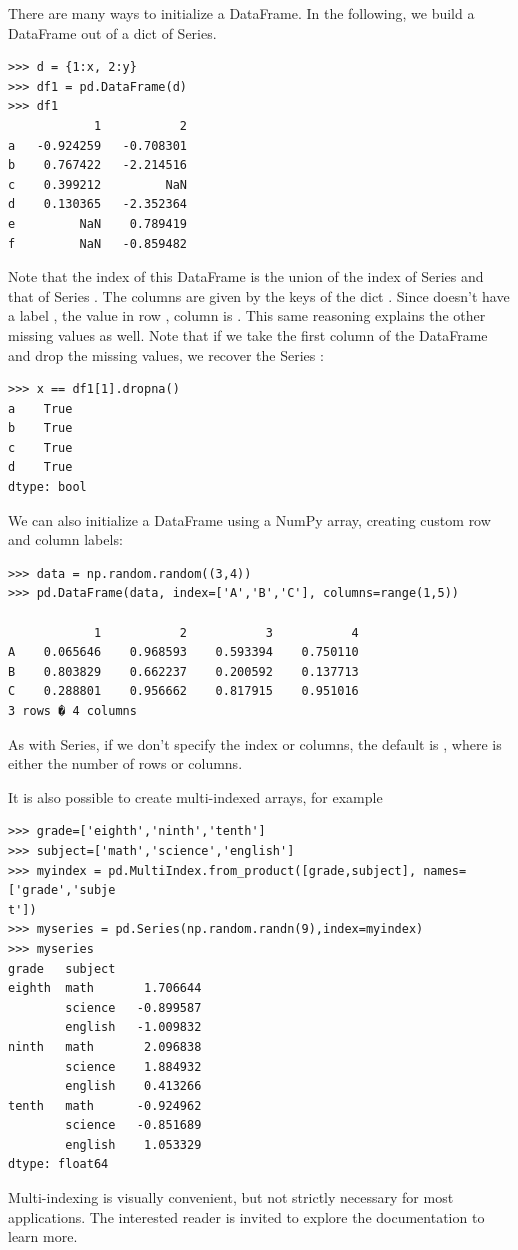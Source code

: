 There are many ways to initialize a DataFrame. In the following, we build a DataFrame out of a
dict of Series.
\begin{lstlisting}
>>> d = {1:x, 2:y}
>>> df1 = pd.DataFrame(d)
>>> df1
	        1	        2
a	-0.924259	-0.708301
b	 0.767422	-2.214516
c	 0.399212	      NaN
d	 0.130365	-2.352364
e	      NaN	 0.789419
f	      NaN	-0.859482
\end{lstlisting}
Note that the index of this DataFrame is the union of the index of Series  and that of Series .
The columns are given by the keys of the dict . Since  doesn't have a label , the
value in row , column  is . This same reasoning explains the other missing values as well.
Note that if we take the first column of the DataFrame and drop the missing values, we recover the Series :
\begin{lstlisting}
>>> x == df1[1].dropna()
a    True
b    True
c    True
d    True
dtype: bool
\end{lstlisting}

We can also initialize a DataFrame using a NumPy array, creating custom row and column labels:
\begin{lstlisting}
>>> data = np.random.random((3,4))
>>> pd.DataFrame(data, index=['A','B','C'], columns=range(1,5))

            1	        2	        3	        4
A	 0.065646	 0.968593	 0.593394	 0.750110
B	 0.803829	 0.662237	 0.200592	 0.137713
C	 0.288801	 0.956662	 0.817915	 0.951016
3 rows � 4 columns
\end{lstlisting}
As with Series, if we don't specify the index or columns, the default is , where  is either the number of
rows or columns.

It is also possible to create multi-indexed arrays, for example
\begin{lstlisting}
>>> grade=['eighth','ninth','tenth']
>>> subject=['math','science','english']
>>> myindex = pd.MultiIndex.from_product([grade,subject], names=['grade','subje
t'])
>>> myseries = pd.Series(np.random.randn(9),index=myindex)
>>> myseries
grade   subject
eighth  math       1.706644
        science   -0.899587
        english   -1.009832
ninth   math       2.096838
        science    1.884932
        english    0.413266
tenth   math      -0.924962
        science   -0.851689
        english    1.053329
dtype: float64
\end{lstlisting}

Multi-indexing is visually convenient, but not strictly necessary for most applications. The interested reader is invited to explore the documentation to learn more.

